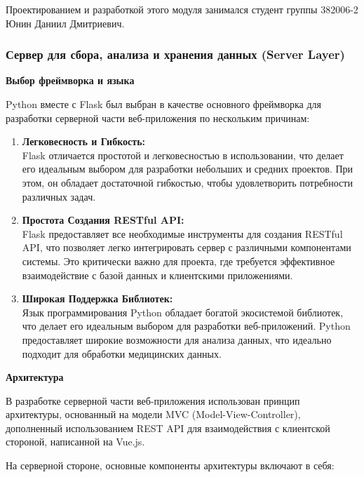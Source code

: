 \documentclass[12pt, russian]{extarticle}
\begin{document}
\begin{spacing}{1.5}
Проектированием и разработкой этого модуля занимался студент группы 382006-2 Юнин Даниил Дмитриевич.

\subsubsection{Сервер для сбора, анализа и хранения данных (Server Layer)}

\par \noindent \textbf{Выбор фреймворка и языка}

Python вместе с Flask был выбран в качестве основного фреймворка для разработки серверной части веб-приложения по нескольким причинам:

\begin{enumerate}
    \item \textbf{Легковесность и Гибкость:} \\
        Flask отличается простотой и легковесностью в использовании, что делает его идеальным выбором для разработки небольших и средних проектов. При этом, он обладает достаточной гибкостью, чтобы удовлетворить потребности различных задач.
    \item \textbf{Простота Создания RESTful API:} \\
        Flask предоставляет все необходимые инструменты для создания RESTful API, что позволяет легко интегрировать сервер с различными компонентами системы. Это критически важно для проекта, где требуется эффективное взаимодействие с базой данных и клиентскими приложениями.
    \item \textbf{Широкая Поддержка Библиотек:} \\
        Язык программирования Python обладает богатой экосистемой библиотек, что делает его идеальным выбором для разработки веб-приложений. Python предоставляет широкие возможности для анализа данных, что идеально подходит для обработки медицинских данных.
\end{enumerate}

\par \noindent \textbf{Архитектура}

В разработке серверной части веб-приложения использован принцип архитектуры, основанный на модели MVC (Model-View-Controller), дополненный использованием REST API для взаимодействия с клиентской стороной, написанной на Vue.js.

На серверной стороне, основные компоненты архитектуры включают в себя:


\end{spacing}
\end{document}
